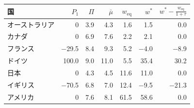\begin{tabular}{lrrrrrr}
\toprule
国 & $P_{1}$ & $\Pi$ & $\bar\mu$ & $w_{\mathrm{eq}}$ & $w^*$ & $w^* - \frac{w_{\mathrm{eq}}}{1+\tau}$ \\
\midrule
オーストラリア & 0 & 3.9 & 4.3 & 1.6 & 1.5 & 0.0 \\
カナダ & 0 & 6.9 & 7.6 & 2.2 & 2.1 & 0.0 \\
フランス & \ensuremath{-}29.5 & 8.4 & 9.3 & 5.2 & \ensuremath{-}4.0 & \ensuremath{-}8.9 \\
ドイツ & 100.0 & 9.0 & 11.0 & 5.5 & 35.4 & 30.2 \\
日本 & 0 & 4.3 & 4.5 & 11.6 & 11.0 & 0.0 \\
イギリス & \ensuremath{-}70.5 & 6.8 & 7.0 & 12.4 & \ensuremath{-}9.5 & \ensuremath{-}21.3 \\
アメリカ & 0 & 7.6 & 8.1 & 61.5 & 58.6 & 0.0 \\
\bottomrule
\end{tabular}
